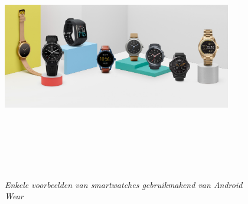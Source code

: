 \begin{figure}[h]
	\caption{\textit{Enkele voorbeelden van smartwatches gebruikmakend van Android Wear}}
	\includegraphics[width=10cm, height=10cm, keepaspectratio]{img/WearExamples}\\[.5cm]
	\centering
\end{figure}
